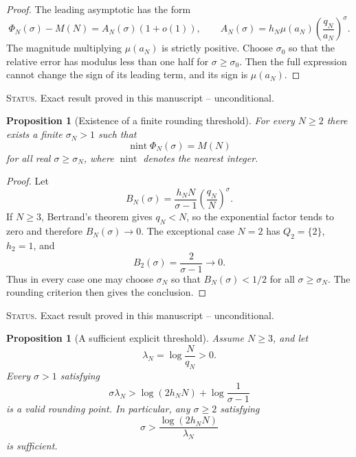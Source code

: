 \documentclass[11pt]{amsart}
\numberwithin{equation}{section}
\theoremstyle{plain}
\newtheorem{proposition}[theorem]{Proposition}
\theoremstyle{definition}
\theoremstyle{remark}
\newcommand{\1}{\mathbf{1}}
\newcommand{\statusnote}[1]{%
  \par\smallskip\noindent
  \begingroup\footnotesize\textsc{Status.} #1\endgroup
  \par\smallskip}
\begin{document}
\begin{proof}
The leading asymptotic has the form
\begin{equation}
\Phi_N(\sigma)-M(N)
=
A_N(\sigma)(1+o(1)),
\qquad
A_N(\sigma)
=
h_N\mu(a_N)\left(\frac{q_N}{a_N}\right)^\sigma.
\label{eq:eventual_sign_leading_term}
\end{equation}
The magnitude multiplying \(\mu(a_N)\) is strictly positive.  Choose
\(\sigma_0\) so that the relative error has modulus less than one half for
\(\sigma\geq\sigma_0\).  Then the full expression cannot change the sign
of its leading term, and its sign is \(\mu(a_N)\).
\end{proof}

\statusnote{Exact result proved in this manuscript -- unconditional.}
\begin{proposition}[Existence of a finite rounding threshold]
\label{prop:finite_rounding_threshold}
For every $N\geq2$ there exists a finite $\sigma_N>1$ such that
\begin{equation}
\operatorname{nint}\Phi_N(\sigma)=M(N)
\label{eq:eventual_rounding}
\end{equation}
for all real $\sigma\geq\sigma_N$, where $\operatorname{nint}$ denotes the
nearest integer.
\end{proposition}

\begin{proof}
Let
\begin{equation}
B_N(\sigma)
=
\frac{h_NN}{\sigma-1}
\left(\frac{q_N}{N}\right)^\sigma.
\label{eq:rounding_threshold_bound_function}
\end{equation}
If \(N\geq3\), Bertrand's theorem gives \(q_N<N\), so the exponential
factor tends to zero and therefore \(B_N(\sigma)\to0\).  The exceptional
case \(N=2\) has \(Q_2=\{2\}\), \(h_2=1\), and
\begin{equation}
B_2(\sigma)=\frac{2}{\sigma-1}\longrightarrow0.
\label{eq:rounding_threshold_N2}
\end{equation}
Thus in every case one may choose \(\sigma_N\) so that
\(B_N(\sigma)<1/2\) for all \(\sigma\geq\sigma_N\).  The rounding
criterion then gives the conclusion.
\end{proof}

\statusnote{Exact result proved in this manuscript -- unconditional.}
\begin{proposition}[A sufficient explicit threshold]
\label{prop:explicit_rounding_threshold}
Assume $N\geq3$, and let
\begin{equation}
\lambda_N=\log\frac{N}{q_N}>0.
\label{eq:lambdaN_definition}
\end{equation}
Every $\sigma>1$ satisfying
\begin{equation}
\sigma\lambda_N
>
\log(2h_NN)+\log\frac1{\sigma-1}
\label{eq:explicit_threshold_implicit}
\end{equation}
is a valid rounding point.  In particular, any $\sigma\geq2$ satisfying
\begin{equation}
\sigma
>
\frac{\log(2h_NN)}{\lambda_N}
\label{eq:explicit_threshold_simple}
\end{equation}
is sufficient.
\end{proposition}
\end{document}

